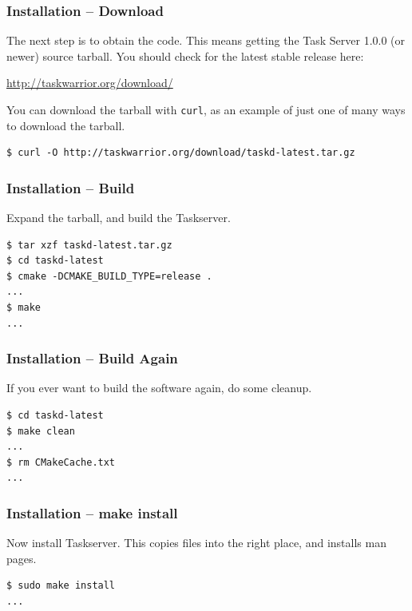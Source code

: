 \documentclass[t,handout]{beamer}
\begin{document}
\begin{frame}[fragile]\frametitle{Installation -- Download}\label{download}
    The next step is to obtain the code. This means getting the Task Server 1.0.0 (or newer) source tarball.  You should check for the latest stable release here:

    \href{http://taskwarrior.org/download/}{http://taskwarrior.org/download/}

    \vfill
    You can download the tarball with \verb+curl+, as an example of just one of many ways to download the tarball.

    \begin{lstlisting}
$ curl -O http://taskwarrior.org/download/taskd-latest.tar.gz
    \end{lstlisting}
\end{frame}

\begin{frame}[fragile]\frametitle{Installation -- Build}\label{build}
    Expand the tarball, and build the Taskserver.

    \begin{lstlisting}
$ tar xzf taskd-latest.tar.gz
$ cd taskd-latest
$ cmake -DCMAKE_BUILD_TYPE=release .
...
$ make
...
    \end{lstlisting}
\end{frame}

\begin{frame}[fragile]\frametitle{Installation -- Build Again}\label{buildagain}
    If you ever want to build the software again, do some cleanup.

    \begin{lstlisting}
$ cd taskd-latest
$ make clean
...
$ rm CMakeCache.txt
...
    \end{lstlisting}
\end{frame}



\begin{frame}[fragile]\frametitle{Installation -- make install}
    Now install Taskserver.  This copies files into the right place, and installs man pages.

    \begin{lstlisting}
$ sudo make install
...
    \end{lstlisting}
\end{frame}
\end{document}
